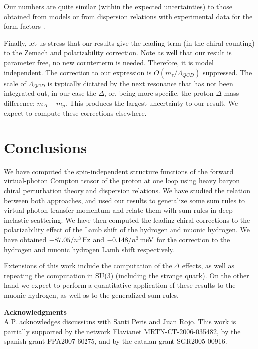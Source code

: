 \documentclass[a4paper,12pt]{article}
\begin{document}
Our numbers are quite similar (within the expected uncertainties) to those obtained from models 
or from dispersion relations with experimental data for the 
form factors \cite{KS,pachucki2,Rosenfelder:1999px,Faustov:1999ga,Martynenko:2005rc}.

Finally, let us stress that our results give the leading term (in the chiral counting) 
to the Zemach and polarizability correction. Note as well that our result is parameter free, 
no new counterterm is needed. Therefore, it is model independent. The correction 
to our expression is $O(m_{\pi}/\Lambda_{QCD})$ suppressed. The scale of $\Lambda_{QCD}$ is 
typically dictated by the next resonance that has not been integrated out, in 
our case the $\Delta$, or, being more specific, the proton-$\Delta$ mass difference: 
$m_{\Delta}-m_p$. This produces the largest uncertainty to our result. We expect to 
compute these corrections elsewhere. 
 
\section{Conclusions}

We have computed the spin-independent 
structure functions of the forward virtual-photon Compton 
tensor of the proton at one loop using heavy baryon chiral  
perturbation theory and dispersion relations. We have studied 
the relation between both approaches, and used our results 
to generalize some sum rules to virtual photon transfer momentum and 
relate them with sum rules in deep inelastic scattering. 
We have then computed the leading chiral 
corrections to the polarizability effect of the 
 Lamb shift of the hydrogen and 
muonic hydrogen. We have obtained $-{87.05}/{n^3}\,{\rm Hz}$ and $-{0.148}/{n^3}\,{\rm meV}$ 
for the correction to the hydrogen and muonic hydrogen Lamb shift respectively. 

Extensions of this work include the computation of the $\Delta$ effects, as well as repeating 
the computation in SU(3) (including the strange quark). On the other hand we 
expect to perform a quantitative application of these results to the muonic hydrogen, 
as well as to the generalized sum rules. 


\medskip

{\bf Acknowledgments} \\ 
A.P. acknowledges discussions with Santi Peris and Juan Rojo. 
This work is partially supported by the 
network Flavianet MRTN-CT-2006-035482, by the spanish 
grant FPA2007-60275, and by the catalan grant SGR2005-00916.
\end{document}
